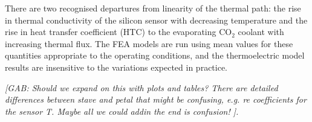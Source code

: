 There are two recognised departures from linearity of the thermal path: the rise in thermal conductivity of the silicon sensor with decreasing temperature and the rise in heat transfer coefficient (HTC) to the evaporating CO$_2$ coolant with increasing thermal flux. The FEA models are run using mean values for these quantities appropriate to the operating conditions, and the thermoelectric model results are insensitive to the variations expected in practice.

\textit{[GAB: Should we expand on this with plots and tables? There are detailed differences between stave and petal that might be confusing, e.g. re coefficients for the sensor T.      Maybe all we could addin the end is confusion! ].}



